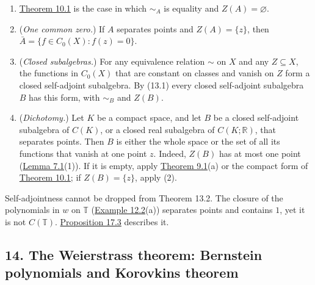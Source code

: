 \documentclass[
  english,
  11pt,
  a4paper,
]{article}
\providecommand{\tightlist}{%
  \setlength{\itemsep}{0pt}\setlength{\parskip}{0pt}}
\begin{document}
\begin{enumerate}
\tightlist
\item
  \hyperlink{the-stone-weierstrass-theorem-for-functions-vanishing-at-infinity--oa-fnd-sw-09}{Theorem
  10.1} is the case in which \(\sim_A\) is equality and
  \(Z(A)=\varnothing\).
\item
  (\emph{One common zero.}) If \(A\) separates points and
  \(Z(A)=\{z\}\), then \(\bar A=\{f\in C_0(X):f(z)=0\}\).
\item
  (\emph{Closed subalgebras.}) For any equivalence relation \(\sim\) on
  \(X\) and any \(Z\subseteq X\), the functions in \(C_0(X)\) that are
  constant on classes and vanish on \(Z\) form a closed self-adjoint
  subalgebra. By (13.1) every closed self-adjoint subalgebra \(B\) has
  this form, with \(\sim_B\) and \(Z(B)\).
\item
  (\emph{Dichotomy.}) Let \(K\) be a compact space, and let \(B\) be a
  closed self-adjoint subalgebra of \(C(K)\), or a closed real
  subalgebra of \(C(K;\mathbb R)\), that separates points. Then \(B\) is
  either the whole space or the set of all its functions that vanish at
  one point \(z\). Indeed, \(Z(B)\) has at most one point
  (\hyperlink{the-stone-weierstrass-theorem-for-functions-vanishing-at-infinity--oa-fnd-sw-05}{Lemma
  7.1}(1)). If it is empty, apply
  \hyperlink{the-stone-weierstrass-theorem-for-functions-vanishing-at-infinity--oa-fnd-sw-07}{Theorem
  9.1}(a) or the compact form of
  \hyperlink{the-stone-weierstrass-theorem-for-functions-vanishing-at-infinity--oa-fnd-sw-09}{Theorem
  10.1}; if \(Z(B)=\{z\}\), apply (2).
\end{enumerate}

Self-adjointness cannot be dropped from Theorem 13.2. The closure of the
polynomials in \(w\) on \(\mathbb T\)
(\hyperlink{the-stone-weierstrass-theorem-for-functions-vanishing-at-infinity--oa-fnd-sw-11}{Example
12.2}(a)) separates points and contains \(1\), yet it is not
\(C(\mathbb T)\).
\hyperlink{the-stone-weierstrass-theorem-for-functions-vanishing-at-infinity--oa-fnd-sw-19}{Proposition
17.3} describes it.

\subsection[14. The Weierstrass theorem: Bernstein polynomials and
Korovkin\textquotesingle s
theorem]{\texorpdfstring{\protect\hypertarget{the-stone-weierstrass-theorem-for-functions-vanishing-at-infinity--oa-fnd-sw-14}{}{}14.
The Weierstrass theorem: Bernstein polynomials and
Korovkin\textquotesingle s
theorem}{14. The Weierstrass theorem: Bernstein polynomials and Korovkin\textquotesingle s theorem}}\label{the-stone-weierstrass-theorem-for-functions-vanishing-at-infinity--OA-FND-SW-14}
\end{document}

